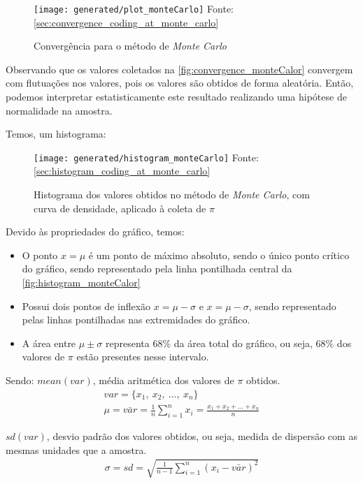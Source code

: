 \begin{figure}[H]
   \centering
   \caption{Convergência para o método de \textit{Monte Carlo}}
   \texttt{[image: generated/plot\_monteCarlo]}
   Fonte: \autoref{sec:convergence_coding_at_monte_carlo}
   \label{fig:convergence_monteCalor}
\end{figure}%

Observando que os valores coletados na \autoref{fig:convergence_monteCalor} convergem com flutuações nos valores, pois os valores são obtidos de forma aleatória. Então, podemos interpretar estatisticamente este resultado realizando uma hipótese de normalidade na amostra.
 
Temos, um histograma:

\begin{figure}[H]
   \centering
   \caption{Histograma dos valores obtidos no método de \textit{Monte Carlo}, com curva de densidade, aplicado à coleta de $\pi$}
   \texttt{[image: generated/histogram\_monteCarlo]}
   Fonte: \autoref{sec:histogram_coding_at_monte_carlo}
   \label{fig:histogram_monteCalor}
\end{figure}%

Devido às propriedades do gráfico, temos:
\begin{itemize}
   \item O ponto $x = \mu$ é um ponto de máximo absoluto, sendo o único ponto crítico do gráfico, sendo representado pela linha pontilhada central da \autoref{fig:histogram_monteCalor}
   \item Possui dois pontos de inflexão $x = \mu - \sigma$ e $x = \mu - \sigma$, sendo representado pelas linhas pontilhadas nas extremidades do gráfico.
   \item A área entre $\mu \pm \sigma$ representa $68\%$ da área total do gráfico, ou seja, $68\%$ dos valores de $\pi$ estão presentes nesse intervalo.
\end{itemize}
Sendo:
$mean(var)$, média aritmética dos valores de $\pi$ obtidos.
\begin{gather*}
   var = \{x_{1},\ x_{2},\ \dots,\ x_{n}\} \\
   \mu = \bar{var} = \frac{1}{n} \sum_{i=1}^{n} x_{i} = \frac{x_{1} + x_{2} + \dots + x_{n}}{n}
\end{gather*}

$sd(var)$, desvio padrão dos valores obtidos, ou seja, medida de dispersão com as mesmas unidades que a amostra.
\begin{gather*}
   \sigma = sd = \sqrt{\frac{1}{n-1}\sum_{i=1}^{n}\left(x_{i}-\bar{var}\right)^{2}}
\end{gather*}

